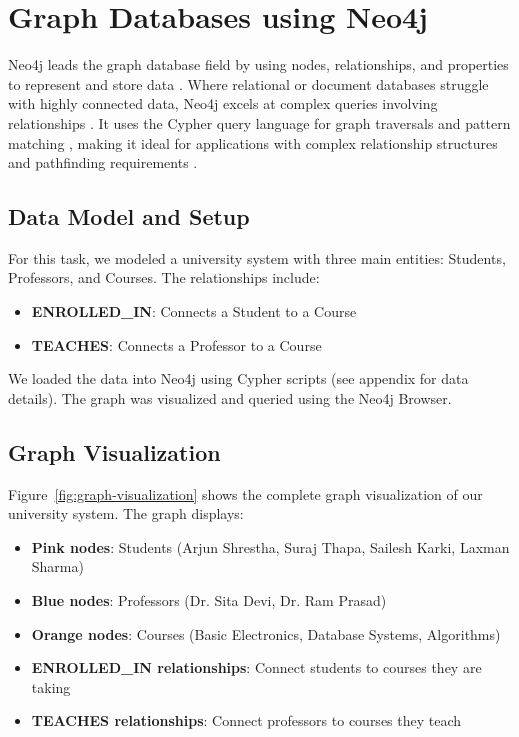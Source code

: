 \chapter{Graph Databases using Neo4j}

Neo4j leads the graph database field by using nodes, relationships, and properties to represent and store data \parencite{neo4j_survey}. Where relational or document databases struggle with highly connected data, Neo4j excels at complex queries involving relationships \parencite{neo4j_manual}. It uses the Cypher query language for graph traversals and pattern matching \parencite{cypher_query_language}, making it ideal for applications with complex relationship structures and pathfinding requirements \parencite{neo4j_survey}.

\section{Data Model and Setup}
For this task, we modeled a university system with three main entities: Students, Professors, and Courses. The relationships include:
\begin{itemize}
  \item \textbf{ENROLLED\_IN}: Connects a Student to a Course
  \item \textbf{TEACHES}: Connects a Professor to a Course
\end{itemize}

We loaded the data into Neo4j using Cypher scripts (see appendix for data details). The graph was visualized and queried using the Neo4j Browser.

\section{Graph Visualization}
Figure~\ref{fig:graph-visualization} shows the complete graph visualization of our university system. The graph displays:
\begin{itemize}
  \item \textbf{Pink nodes}: Students (Arjun Shrestha, Suraj Thapa, Sailesh Karki, Laxman Sharma)
  \item \textbf{Blue nodes}: Professors (Dr. Sita Devi, Dr. Ram Prasad)
  \item \textbf{Orange nodes}: Courses (Basic Electronics, Database Systems, Algorithms)
  \item \textbf{ENROLLED\_IN relationships}: Connect students to courses they are taking
  \item \textbf{TEACHES relationships}: Connect professors to courses they teach
\end{itemize}


